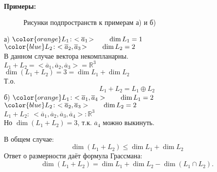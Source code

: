~\

\noindent\textbf{Примеры:}
\begin{figure}[h]
	\begin{minipage}[h]{0.49\linewidth}
	\end{minipage}
	\hfill
	\begin{minipage}[h]{0.49\linewidth}
	\end{minipage}
	\caption{Рисунки подпространств к примерам а) и б)}
	\label{ris:image1}
\end{figure}

\noindent а) ${\color{orange}L_1}\!:~ <\overline{a}_1\!> \qquad \dim L_1 = 1$\\
\phantom{а)}${\color{blue}L_2}\!:~ <\overline{a}_2, \overline{a}_3\!> \qquad \dim L_2 = 2$\\
В данном случае вектора некомпланарны.\\
$L_1+L_2=<\overline{a}_1, \overline{a}_2, \overline{a}_3\!> = \mathbb{R}^3$\\
$\dim (L_1 +L_2) = 3 = \dim L_1 + \dim L_2$\\
Т.о.
$$
L_1+L_2 = L_1 \oplus L_2
$$
б) ${\color{orange}L_1}\!:~ <\overline{a}_1, \overline{a}_4> \qquad \dim L_1 = 2$\\
${\color{blue}L_2}\!:~ <\overline{a}_2, \overline{a}_3> \qquad \dim L_2 = 2$\\
$L_1+L_2\!:~<\overline{a}_1, \overline{a}_2, \overline{a}_3, \overline{a}_4\!>: \mathbb{R}^3$\\
Но $\dim (L_1+L_2)=3$, т.к. $\overline{a}_4$ можно выкинуть.

В общем случае:
$$
\dim (L_1+L_2) \leq \dim L_1 + \dim L_2
$$
Ответ о размерности даёт \textsf{формула Грассмана}:
$$
\dim (L_1+L_2)=\dim L_1+ \dim L_2 - \dim(L_1\cap L_2).
$$
